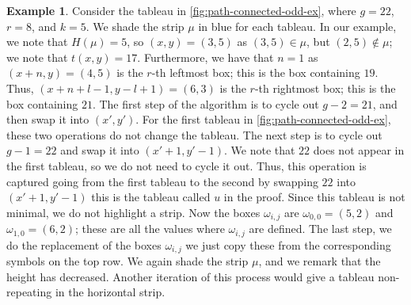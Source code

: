 \documentclass[11pt,reqno]{amsart}
\theoremstyle{definition}
\theoremstyle{problem}
\newtheorem{example}[definition]{Example}
\theoremstyle{plain}
\theoremstyle{remark}
\theoremstyle{theorem}
\numberwithin{equation}{section}
\numberwithin{figure}{section}
\theoremstyle{definition}
\theoremstyle{problem}
\newtheorem{example}[definition]{Example}
\theoremstyle{plain}
\begin{document}
\begin{example}\label{ex:3}
  Consider the tableau in \cref{fig:path-connected-odd-ex}, where
  $g=22$, $r=8$, and $k=5$. We shade the strip $\mu$ in blue for each
  tableau. In our example, we note that $H(\mu)=5$, so $(x,y)=(3,5)$
  as $(3,5)\in \mu$, but $(2,5)\notin\mu$; we note that
  $t(x,y)=17$. Furthermore, we have that $n=1$ as $(x+n,y)=(4,5)$ is
  the $r$-th leftmost box; this is the box containing $19$. Thus,
  $(x+n+l-1,y-l+1)=(6,3)$ is the $r$-th rightmost box; this is the box
  containing $21$. The first step of the algorithm is to cycle out
  $g-2=21$, and then swap it into $(x',y')$. For the first tableau in
  \cref{fig:path-connected-odd-ex}, these two operations do not change
  the tableau. The next step is to cycle out $g-1=22$ and swap it into
  $(x'+1,y'-1)$. We note that $22$ does not appear in the first
  tableau, so we do not need to cycle it out. Thus, this operation is
  captured going from the first tableau to the second by swapping $22$
  into $(x'+1,y'-1)$ this is the tableau called $u$ in the
  proof. Since this tableau is not minimal, we do not highlight a
  strip. Now the boxes $\omega_{i,j}$ are $\omega_{0,0}=(5,2)$ and
  $\omega_{1,0}=(6,2)$; these are all the values where $\omega_{i,j}$
  are defined. The last step, we do the replacement of the boxes
  $\omega_{i,j}$ we just copy these from the corresponding symbols on
  the top row. We again shade the strip $\mu$, and we remark that the
  height has decreased. Another iteration of this process would give a
  tableau non-repeating in the horizontal strip.
  \begin{figure}[H]
    
    \caption{}
    \label{fig:path-connected- right component of both
    	$T_r \setminus \mu$ and $T_r \setminus \nu$ for $j \geq 1$.  See
    	\cref{fig:pathoddproof} for a schematic diagram of our notations.
    	
    	To go from $t$ to $s$, we could try to replace the symbol in
    	$\omega_{i,j}$ with the symbol in $\psi_i$ for each $i$ and $j$, and
    	leave all other symbols unchanged.  This operation does not change
    	the diagonal modulo $k$ in which any symbol lives; this, combined
    	with the fact that $t$ is minimal, would imply that $t$ and $s$ are
    	equivalent.  This should be an immediate cause for worry, since, by
    	\cref{prop:2}, two tableaux that are non-repeating on different
    	strips cannot be equivalent.  The tableau condition must fail
    	somewhere.  In fact, it fails precisely at $\omega_{n,0}$, which
    	lies on $A_{r-1}$.  Indeed, we have
    	$t(\psi_n) > t(\psi_n - \hat y) = t(\omega_{n,0}+ \hat x)$; it is
    	also possible (though not necessary) that
    	$t(\psi_n) > t(\omega_{n,0} + \hat y)$.  This cause a failure of the
    	tableau condition when we attempt to copy the symbol $t(\psi_n)$
    	into $\omega_{n,0}$.  We shall modify $t$ so that these issues are
    	avoided; in particular, we will put the two largest symbols, $g-2$
    	and $g-1$, into $\omega_{n,0} + \hat y$ and $\omega_{n,0} + \hat x$,
    	respectively.  Afterwards, we shall verify that the tableau
    	condition does not fail anywhere else.
    	
}
\end{figure}
\end{example}
\end{document}
